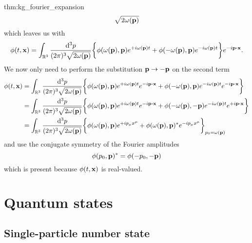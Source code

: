 \begin{delayedproof}{thm:kg_fourier_expansion}
\begin{equation*}
{		}{\sqrt{2\omega(\vb{p})}}
	\end{equation*}
	which leaves us with
	\begin{equation*}
		\phi(t,\vb{x})
		=
		\int_{\mathbb{R}^3}\frac{\dd[3]{p}}{(2\pi)^3\sqrt{2\omega(\vb{p})}}
		\biggl\{
			\phi(\omega(\vb{p}),\vb{p})
			e^{+i\omega(\vb{p})t}
			+
			\phi(-\omega(\vb{p}),\vb{p})
			e^{-i\omega(\vb{p})t}
		\biggr\}
		e^{-i\vb{p}\vdot\vb{x}}
		.
	\end{equation*}
	We now only need to perform the substitution $\vb{p}\to-\vb{p}$ on the second term
	\begin{equation*}
		\begin{split}
			\phi(t,\vb{x})
			&=
			\int_{\mathbb{R}^3}\frac{\dd[3]{p}}{(2\pi)^3\sqrt{2\omega(\vb{p})}}
			\biggl\{
				\phi(\omega(\vb{p}),\vb{p})
				e^{+i\omega(\vb{p})t}
				e^{-i\vb{p}\vdot\vb{x}}
				+
				\phi(-\omega(\vb{p}),\vb{p})
				e^{-i\omega(\vb{p})t}
				e^{-i\vb{p}\vdot\vb{x}}
			\biggr\}
			\\
			&=
			\int_{\mathbb{R}^3}\frac{\dd[3]{p}}{(2\pi)^3\sqrt{2\omega(\vb{p})}}
			\biggl\{
				\phi(\omega(\vb{p}),\vb{p})
				e^{+i\omega(\vb{p})t}
				e^{-i\vb{p}\vdot\vb{x}}
				+
				\phi(-\omega(\vb{p}),-\vb{p})
				e^{-i\omega(\vb{p})t}
				e^{+i\vb{p}\vdot\vb{x}}
			\biggr\}
			\\
			&=
			\int_{\mathbb{R}^3}\frac{\dd[3]{p}}{(2\pi)^3\sqrt{2\omega(\vb{p})}}
			\biggl\{
				\phi(\omega(\vb{p}),\vb{p})
				e^{+ip_\mu x^\mu}
				+
				\phi(\omega(\vb{p}),\vb{p})^*
				e^{-ip_\mu x^\mu}
			\biggr\}_{p_0=\omega(\vb{p})}
		\end{split}
	\end{equation*}
	and use the conjugate symmetry of the Fourier amplitudes
	\begin{equation*}
		\phi(p_0,\vb{p})^*
		=
		\phi(-p_0,-\vb{p})
	\end{equation*}
	which is present because $\phi(t,\vb{x})$ is real-valued.
\end{delayedproof}

\section{Quantum states}

\subsection{Single-particle number state}


